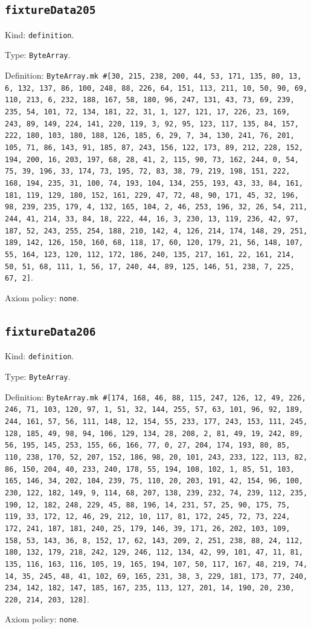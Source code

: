 \documentclass[11pt]{article}
\begin{document}
\subsection*{\texttt{fixtureData205}}
\noindent Kind: \texttt{definition}.\par
\noindent Type: \texttt{ByteArray}.\par
\noindent Definition: \texttt{ByteArray.mk \#[30, 215, 238, 200, 44, 53, 171, 135, 80, 13, 6, 132, 137, 86, 100, 248, 88, 226, 64, 151, 113, 211, 10, 50, 90, 69, 110, 213, 6, 232, 188, 167, 58, 180, 96, 247, 131, 43, 73, 69, 239, 235, 54, 101, 72, 134, 181, 22, 31, 1, 127, 121, 17, 226, 23, 169, 243, 89, 149, 224, 141, 220, 119, 3, 92, 95, 123, 117, 135, 84, 157, 222, 180, 103, 180, 188, 126, 185, 6, 29, 7, 34, 130, 241, 76, 201, 105, 71, 86, 143, 91, 185, 87, 243, 156, 122, 173, 89, 212, 228, 152, 194, 200, 16, 203, 197, 68, 28, 41, 2, 115, 90, 73, 162, 244, 0, 54, 75, 39, 196, 33, 174, 73, 195, 72, 83, 38, 79, 219, 198, 151, 222, 168, 194, 235, 31, 100, 74, 193, 104, 134, 255, 193, 43, 33, 84, 161, 181, 119, 129, 180, 152, 161, 229, 47, 72, 48, 90, 171, 45, 32, 196, 98, 239, 235, 179, 4, 132, 165, 104, 2, 46, 253, 196, 32, 26, 54, 211, 244, 41, 214, 33, 84, 18, 222, 44, 16, 3, 230, 13, 119, 236, 42, 97, 187, 52, 243, 255, 254, 188, 210, 142, 4, 126, 214, 174, 148, 29, 251, 189, 142, 126, 150, 160, 68, 118, 17, 60, 120, 179, 21, 56, 148, 107, 55, 164, 123, 120, 112, 172, 186, 240, 135, 217, 161, 22, 161, 214, 50, 51, 68, 111, 1, 56, 17, 240, 44, 89, 125, 146, 51, 238, 7, 225, 67, 2]}.\par
\noindent Axiom policy: \texttt{none}.\par
\subsection*{\texttt{fixtureData206}}
\noindent Kind: \texttt{definition}.\par
\noindent Type: \texttt{ByteArray}.\par
\noindent Definition: \texttt{ByteArray.mk \#[174, 168, 46, 88, 115, 247, 126, 12, 49, 226, 246, 71, 103, 120, 97, 1, 51, 32, 144, 255, 57, 63, 101, 96, 92, 189, 244, 161, 57, 56, 111, 148, 12, 154, 55, 233, 177, 243, 153, 111, 245, 128, 185, 49, 98, 94, 106, 129, 134, 28, 208, 2, 81, 49, 19, 242, 89, 56, 195, 145, 253, 155, 66, 166, 77, 0, 27, 204, 174, 193, 80, 85, 110, 238, 170, 52, 207, 152, 186, 98, 20, 101, 243, 233, 122, 113, 82, 86, 150, 204, 40, 233, 240, 178, 55, 194, 108, 102, 1, 85, 51, 103, 165, 146, 34, 202, 104, 239, 75, 110, 20, 203, 191, 42, 154, 96, 100, 230, 122, 182, 149, 9, 114, 68, 207, 138, 239, 232, 74, 239, 112, 235, 190, 12, 182, 248, 229, 45, 88, 196, 14, 231, 57, 25, 90, 175, 75, 119, 33, 172, 12, 46, 29, 212, 10, 117, 81, 172, 245, 72, 73, 224, 172, 241, 187, 181, 240, 25, 179, 146, 39, 171, 26, 202, 103, 109, 158, 53, 143, 36, 8, 152, 17, 62, 143, 209, 2, 251, 238, 88, 24, 112, 180, 132, 179, 218, 242, 129, 246, 112, 134, 42, 99, 101, 47, 11, 81, 135, 116, 163, 116, 105, 19, 165, 194, 107, 50, 117, 167, 48, 219, 74, 14, 35, 245, 48, 41, 102, 69, 165, 231, 38, 3, 229, 181, 173, 77, 240, 234, 142, 182, 147, 185, 167, 235, 113, 127, 201, 14, 190, 20, 230, 220, 214, 203, 128]}.\par
\noindent Axiom policy: \texttt{none}.\par
\end{document}
